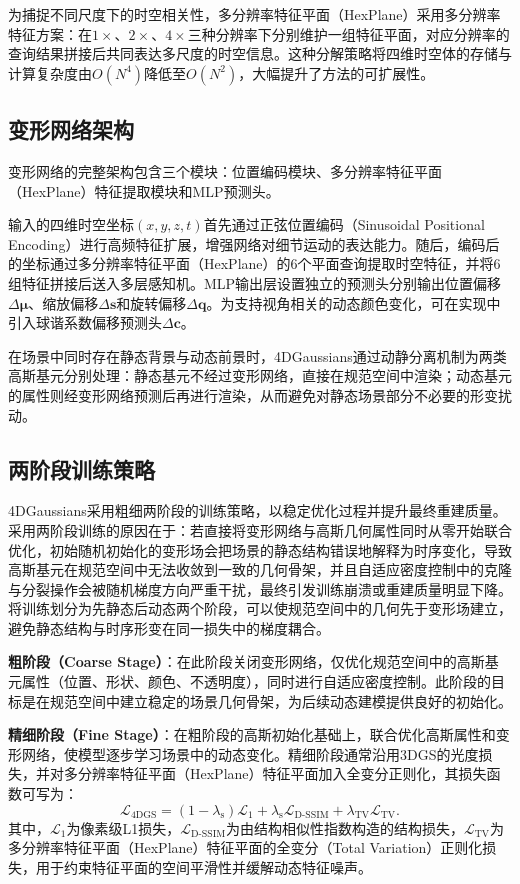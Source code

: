 为捕捉不同尺度下的时空相关性，多分辨率特征平面（HexPlane）采用多分辨率特征方案：在$1\times$、$2\times$、$4\times$三种分辨率下分别维护一组特征平面，对应分辨率的查询结果拼接后共同表达多尺度的时空信息。这种分解策略将四维时空体的存储与计算复杂度由$O(N^4)$降低至$O(N^2)$，大幅提升了方法的可扩展性。

\subsection{变形网络架构}

变形网络的完整架构包含三个模块：位置编码模块、多分辨率特征平面（HexPlane）特征提取模块和MLP预测头。

输入的四维时空坐标$(x, y, z, t)$首先通过正弦位置编码（Sinusoidal Positional Encoding）进行高频特征扩展，增强网络对细节运动的表达能力。随后，编码后的坐标通过多分辨率特征平面（HexPlane）的6个平面查询提取时空特征，并将6组特征拼接后送入多层感知机。MLP输出层设置独立的预测头分别输出位置偏移$\Delta\boldsymbol{\mu}$、缩放偏移$\Delta\mathbf{s}$和旋转偏移$\Delta\mathbf{q}$。为支持视角相关的动态颜色变化，可在实现中引入球谐系数偏移预测头$\Delta\mathbf{c}$。

在场景中同时存在静态背景与动态前景时，4DGaussians通过动静分离机制为两类高斯基元分别处理：静态基元不经过变形网络，直接在规范空间中渲染；动态基元的属性则经变形网络预测后再进行渲染，从而避免对静态场景部分不必要的形变扰动。

\subsection{两阶段训练策略}

4DGaussians采用粗细两阶段的训练策略，以稳定优化过程并提升最终重建质量。采用两阶段训练的原因在于：若直接将变形网络与高斯几何属性同时从零开始联合优化，初始随机初始化的变形场会把场景的静态结构错误地解释为时序变化，导致高斯基元在规范空间中无法收敛到一致的几何骨架，并且自适应密度控制中的克隆与分裂操作会被随机梯度方向严重干扰，最终引发训练崩溃或重建质量明显下降。将训练划分为先静态后动态两个阶段，可以使规范空间中的几何先于变形场建立，避免静态结构与时序形变在同一损失中的梯度耦合。

\textbf{粗阶段（Coarse Stage）}：在此阶段关闭变形网络，仅优化规范空间中的高斯基元属性（位置、形状、颜色、不透明度），同时进行自适应密度控制。此阶段的目标是在规范空间中建立稳定的场景几何骨架，为后续动态建模提供良好的初始化。

\textbf{精细阶段（Fine Stage）}：在粗阶段的高斯初始化基础上，联合优化高斯属性和变形网络，使模型逐步学习场景中的动态变化。精细阶段通常沿用3DGS的光度损失，并对多分辨率特征平面（HexPlane）特征平面加入全变分正则化，其损失函数可写为：
\begin{equation}
    \mathcal{L}_{\mathrm{4DGS}} = (1-\lambda_{\mathrm{s}})\mathcal{L}_1 + \lambda_{\mathrm{s}} \mathcal{L}_{\mathrm{D}\mbox{-}\mathrm{SSIM}} + \lambda_{\mathrm{TV}}\mathcal{L}_{\mathrm{TV}}.
    \label{eq:4dgs_loss}
\end{equation}其中，$\mathcal{L}_1$为像素级L1损失，$\mathcal{L}_{\mathrm{D}\mbox{-}\mathrm{SSIM}}$为由结构相似性指数构造的结构损失，$\mathcal{L}_{\mathrm{TV}}$为多分辨率特征平面（HexPlane）特征平面的全变分（Total Variation）正则化损失，用于约束特征平面的空间平滑性并缓解动态特征噪声。

